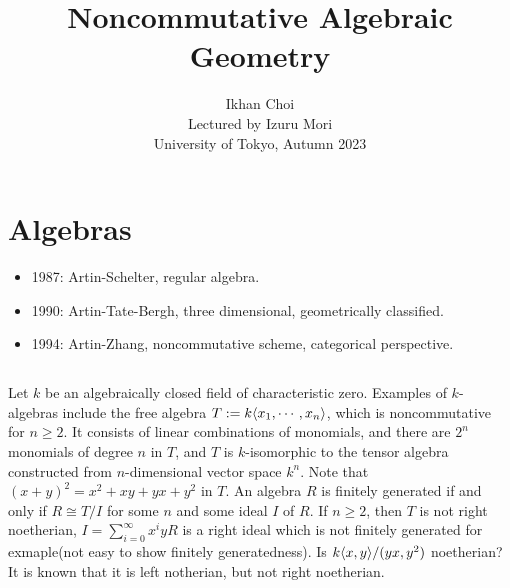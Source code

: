 \documentclass{../../../small}
\begin{document}
\title{Noncommutative Algebraic Geometry}
\author{Ikhan Choi\\Lectured by Izuru Mori\\University of Tokyo, Autumn 2023}
\maketitle

\section{Algebras}



\begin{itemize}
\item 1987: Artin-Schelter, regular algebra.
\item 1990: Artin-Tate-Bergh, three dimensional, geometrically classified.
\item 1994: Artin-Zhang, noncommutative scheme, categorical perspective.
\end{itemize}

\subsection{}
Let $k$ be an algebraically closed field of characteristic zero.
Examples of $k$-algebras include the free algebra $T:=k\langle x_1,\cdots,x_n\rangle$, which is noncommutative for $n\ge2$.
It consists of linear combinations of monomials, and there are $2^n$ monomials of degree $n$ in $T$, and $T$ is $k$-isomorphic to the tensor algebra constructed from $n$-dimensional vector space $k^n$.
Note that $(x+y)^2=x^2+xy+yx+y^2$ in $T$.
An algebra $R$ is finitely generated if and only if $R\cong T/I$ for some $n$ and some ideal $I$ of $R$.
If $n\ge2$, then $T$ is not right noetherian, $I=\sum_{i=0}^\infty x^iyR$ is a right ideal which is not finitely generated for exmaple(not easy to show finitely generatedness).
Is $k\langle x,y\rangle/(yx,y^2)$ noetherian?
It is known that it is left notherian, but not right noetherian.
\end{document}

